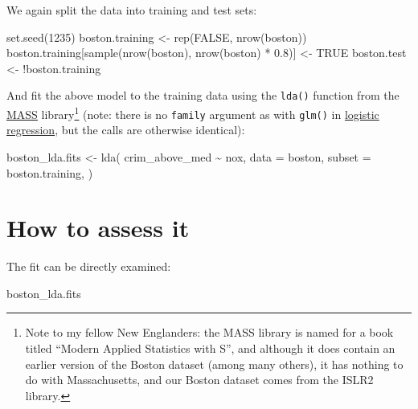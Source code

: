 \documentclass[
]{book}
\newenvironment{Shaded}{\begin{snugshade}}{\end{snugshade}}
\newcommand{\AttributeTok}[1]{\textcolor[rgb]{0.77,0.63,0.00}{#1}}
\newcommand{\ConstantTok}[1]{\textcolor[rgb]{0.00,0.00,0.00}{#1}}
\newcommand{\DecValTok}[1]{\textcolor[rgb]{0.00,0.00,0.81}{#1}}
\newcommand{\FloatTok}[1]{\textcolor[rgb]{0.00,0.00,0.81}{#1}}
\newcommand{\FunctionTok}[1]{\textcolor[rgb]{0.00,0.00,0.00}{#1}}
\newcommand{\NormalTok}[1]{#1}
\newcommand{\OtherTok}[1]{\textcolor[rgb]{0.56,0.35,0.01}{#1}}
\newcommand{\SpecialCharTok}[1]{\textcolor[rgb]{0.00,0.00,0.00}{#1}}
\begin{document}
We again split the data into training and test sets:

\begin{Shaded}
\begin{Highlighting}[]
\FunctionTok{set.seed}\NormalTok{(}\DecValTok{1235}\NormalTok{)}
\NormalTok{boston.training }\OtherTok{\textless{}{-}} \FunctionTok{rep}\NormalTok{(}\ConstantTok{FALSE}\NormalTok{, }\FunctionTok{nrow}\NormalTok{(boston))}
\NormalTok{boston.training[}\FunctionTok{sample}\NormalTok{(}\FunctionTok{nrow}\NormalTok{(boston), }\FunctionTok{nrow}\NormalTok{(boston) }\SpecialCharTok{*} \FloatTok{0.8}\NormalTok{)] }\OtherTok{\textless{}{-}} \ConstantTok{TRUE}
\NormalTok{boston.test }\OtherTok{\textless{}{-}} \SpecialCharTok{!}\NormalTok{boston.training}
\end{Highlighting}
\end{Shaded}

And fit the above model to the training data using the \texttt{lda()} function from the \href{https://cran.r-project.org/package=MASS}{MASS} library\footnote{Note to my fellow New Englanders: the MASS library is named for a book titled ``Modern Applied Statistics with S'', and although it does contain an earlier version of the Boston dataset (among many others), it has nothing to do with Massachusetts, and our Boston dataset comes from the ISLR2 library.} (note: there is no \texttt{family} argument as with \texttt{glm()} in \protect\hyperlink{logistic-regression}{logistic regression}, but the calls are otherwise identical):

\begin{Shaded}
\begin{Highlighting}[]
\NormalTok{boston\_lda.fits }\OtherTok{\textless{}{-}}
  \FunctionTok{lda}\NormalTok{(}
\NormalTok{    crim\_above\_med }\SpecialCharTok{\textasciitilde{}}\NormalTok{ nox,}
    \AttributeTok{data =}\NormalTok{ boston,}
    \AttributeTok{subset =}\NormalTok{ boston.training,}
\NormalTok{  )}
\end{Highlighting}
\end{Shaded}

\hypertarget{how-to-assess-it-3}{%
\section{How to assess it}\label{how-to-assess-it-3}}

The fit can be directly examined:

\begin{Shaded}
\begin{Highlighting}[]
\NormalTok{boston\_lda.fits}
\end{Highlighting}
\end{Shaded}
\end{document}
